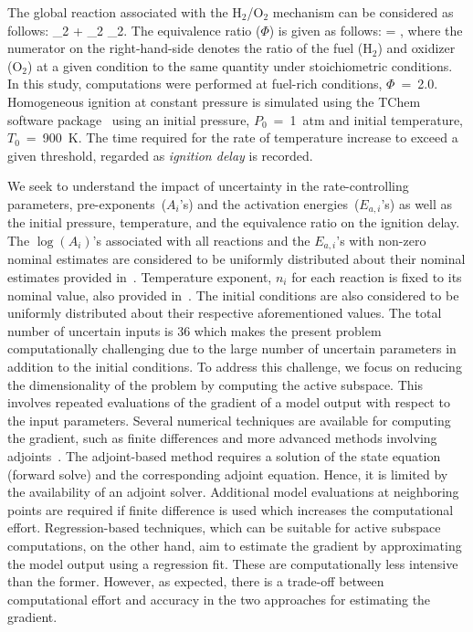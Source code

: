 %
The global reaction associated with the H$_2$/O$_2$ mechanism can
be considered as follows:
_2 + _2 _2.
\label{eq:global}
\ee 
The equivalence ratio ($\Phi$) is given as follows:
%
\be
\Phi = ,
\label{eq:phi}
\ee
%
where the numerator on the right-hand-side denotes the ratio of the fuel (H$_2$)
and oxidizer (O$_2$) at a given condition to the same quantity under stoichiometric
conditions. In this study, computations were performed at fuel-rich conditions,
$\Phi$~=~2.0. Homogeneous ignition at constant pressure is simulated using the
TChem software package~\cite{Safta:2011} using an initial pressure, $P_0$~=~1~atm and
initial temperature, $T_0$~=~900~K. The time required for the rate of
temperature increase to exceed a given threshold, regarded as \emph{ignition delay}
is recorded. 

We seek to understand the impact of uncertainty in the
rate-controlling parameters, pre-exponents~($A_i$'s) 
and the activation energies~($E_{a,i}$'s) 
as well as the initial pressure, temperature, and the
equivalence ratio on the ignition delay. The $\log(A_i)$'s associated with all
reactions and the $E_{a,i}$'s with non-zero nominal estimates
are considered to be uniformly distributed about their nominal estimates provided
in~\cite{Yetter:1991}. Temperature exponent, $n_i$ for each reaction is fixed to
its nominal value, also provided in~\cite{Yetter:1991}.
The initial conditions are also considered to be uniformly
distributed about their respective aforementioned values. 
The total number of uncertain inputs is 36 which makes
the present problem computationally challenging due to the large number of 
uncertain parameters in addition to the initial conditions.  
To address this challenge, we focus on reducing the dimensionality
of the problem by computing the active subspace.
This involves repeated evaluations of the gradient of a model output with
respect to the input parameters. Several numerical techniques are available
for computing the gradient, such as 
finite differences and more advanced methods involving
adjoints~\cite{Jameson:1988,Borzi:2011,Alexanderian:2017}. The
adjoint-based method requires a solution of the state equation (forward solve)
and the corresponding adjoint equation. Hence, it is 
limited by the availability of an adjoint solver. Additional model evaluations
at neighboring points are required if finite difference is used which increases
the computational effort. 
Regression-based techniques, which can be suitable for active subspace computations,
on the other hand, aim to estimate the gradient by approximating the model
output using a regression fit.  
These are computationally less intensive than
the former. However, as expected, there is a trade-off between computational
effort and accuracy in the two approaches for estimating the gradient. 

